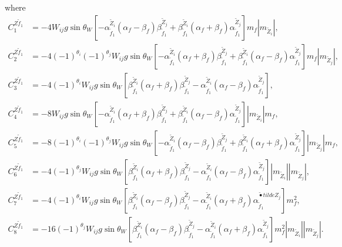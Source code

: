 \documentclass[final,3p,times,pdflatex]{elsarticle}
\begin{document}
where
\begin{align}
C_{1}^{Z \tilde{f}_1} &= -4W_{ij}g \sin\theta_W [-{\alpha_{\tilde{f}_1}^{\tilde{Z}_i}}(\alpha_f-\beta_f){\beta_{\tilde{f}_1}^{\tilde{Z}_j}} + {\beta_{\tilde{f}_1}^{\tilde{Z}_i}}(\alpha_f+\beta_f){\alpha_{\tilde{f}_1}^{\tilde{Z}_j}}]m_{f}|m_{\tilde{Z}_i}|, \\
C_{2}^{Z \tilde{f}_1} &= -4(-1)^{\theta_i}(-1)^{\theta_j}W_{ij}g \sin\theta_W [-{\alpha_{\tilde{f}_1}^{\tilde{Z}_i}}(\alpha_f+\beta_f){\beta_{\tilde{f}_1}^{\tilde{Z}_j}} + {\beta_{\tilde{f}_1}^{\tilde{Z}_i}}(\alpha_f-\beta_f){\alpha_{\tilde{f}_1}^{\tilde{Z}_j}}]m_{f}|m_{\tilde{Z}_j}|, \\
C_{3}^{Z \tilde{f}_1} &= -4(-1)^{\theta_i}W_{ij}g \sin\theta_W [{\beta_{\tilde{f}_1}^{\tilde{Z}_i}}(\alpha_f + \beta_f){\beta_{\tilde{f}_1}^{\tilde{Z}_j}} - {\alpha_{\tilde{f}_1}^{\tilde{Z}_i}}(\alpha_f - \beta_f){\alpha_{\tilde{f}_1}^{\tilde{Z}_j}}], \\
C_{4}^{Z \tilde{f}_1} &= -8W_{ij}g \sin\theta_W [-{\alpha_{\tilde{f}_1}^{\tilde{Z}_i}}(\alpha_f + \beta_f){\beta_{\tilde{f}_1}^{\tilde{Z}_j}} + {\beta_{\tilde{f}_1}^{\tilde{Z}_i}}(\alpha_f - \beta_f){\alpha_{\tilde{f}_1}^{\tilde{Z}_j}}]|m_{\tilde{Z}_i}|m_{f}, \\
C_{5}^{Z \tilde{f}_1} &= -8(-1)^{\theta_i}(-1)^{\theta_j}W_{ij}g \sin\theta_W [-{\alpha_{\tilde{f}_1}^{\tilde{Z}_i}}(\alpha_f - \beta_f){\beta_{\tilde{f}_1}^{\tilde{Z}_j}} + {\beta_{\tilde{f}_1}^{\tilde{Z}_i}}(\alpha_f + \beta_f){\alpha_{\tilde{f}_1}^{\tilde{Z}_j}}]|m_{\tilde{Z}_j}|m_{f}, \\
C_{6}^{Z \tilde{f}_1} &= -4(-1)^{\theta_j}W_{ij}g \sin\theta_W [{\beta_{\tilde{f}_1}^{\tilde{Z}_i}}(\alpha_f + \beta_f){\beta_{\tilde{f}_1}^{\tilde{Z}_j}} - {\alpha_{\tilde{f}_1}^{\tilde{Z}_i}}(\alpha_f - \beta_f){\alpha_{\tilde{f}_1}^{\tilde{Z}_j}}]|m_{\tilde{Z}_i}||m_{\tilde{Z}_j}|, \\
C_{7}^{Z \tilde{f}_1} &= -4(-1)^{\theta_i}W_{ij}g \sin\theta_W [{\beta_{\tilde{f}_1}^{\tilde{Z}_i}}(\alpha_f - \beta_f){\beta_{\tilde{f}_1}^{\tilde{Z}_j}} - {\alpha_{\tilde{f}_1}^{\tilde{Z}_i}}(\alpha_f + \beta_f){\alpha_{\tilde{f}_1}^{\tilde{•}tilde{Z}_j}}]m_{f}^2, \\
C_{8}^{Z \tilde{f}_1} &= -16(-1)^{\theta_j}W_{ij}g \sin\theta_W [{\beta_{\tilde{f}_1}^{\tilde{Z}_i}}(\alpha_f - \beta_f){\beta_{\tilde{f}_1}^{\tilde{Z}_j}} - {\alpha_{\tilde{f}_1}^{\tilde{Z}_i}}(\alpha_f + \beta_f){\alpha_{\tilde{f}_1}^{\tilde{Z}_j}}]m_{f}^2 |m_{\tilde{Z}_i}||m_{\tilde{Z}_j}|.
\end{align}
\end{document}

